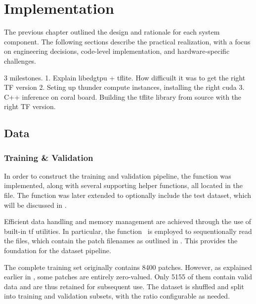 {

\setlength{\parindent}{0pt}
\setlength{\parskip}{1em}

\chapter{Implementation}
\label{chapter:implementation}

The previous chapter outlined the design and rationale for each system component. The following sections describe the practical realization, with a focus on engineering decisions, code-level implementation, and hardware-specific challenges.


3 milestones.
1. Explain libedgtpu + tflite. How difficuilt it was to get the right TF version
2. Seting up thunder compute instances, installing the right cuda
3. C++ inference on coral board. Building the tflite library from source with the right TF version. 


\section{Data}
\label{sec:data}

\subsection{Training \& Validation}

In order to construct the training and validation pipeline, the function  was implemented, along with several supporting helper functions, all located in the  file.
The function was later extended to optionally include the test dataset, which will be discussed in .

Efficient data handling and memory management are achieved through the use of built-in \gls{tf} utilities.
In particular, the  function~\cite{tfTextLineDataset} is employed to sequentionally read the  files,
which contain the patch filenames as outlined in .
This provides the foundation for the dataset pipeline.

The complete training set originally contains 8400 patches. However, as explained earlier in , some patches are entirely zero-valued.
Only 5155 of them contain valid data and are thus retained for subsequent use.
The dataset is shuffled and split into training and validation subsets, with the ratio configurable as needed.

}
